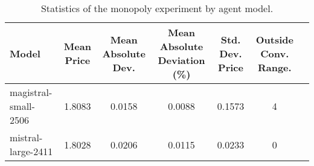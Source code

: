 \begin{table}[H]
\caption{Statistics of the monopoly experiment by agent model.}
\label{tab:monopoly_stats}
\begin{tabular}{lcccccc}
\toprule
Model & Mean Price & Mean Absolute Dev. & Mean Absolute Deviation (\%) & Std. Dev. Price & Outside Conv. Range. \\
\midrule
magistral-small-2506 & 1.8083 & 0.0158 & 0.0088 & 0.1573 & 4 \\
mistral-large-2411 & 1.8028 & 0.0206 & 0.0115 & 0.0233 & 0 \\
\bottomrule
\end{tabular}
\end{table}
